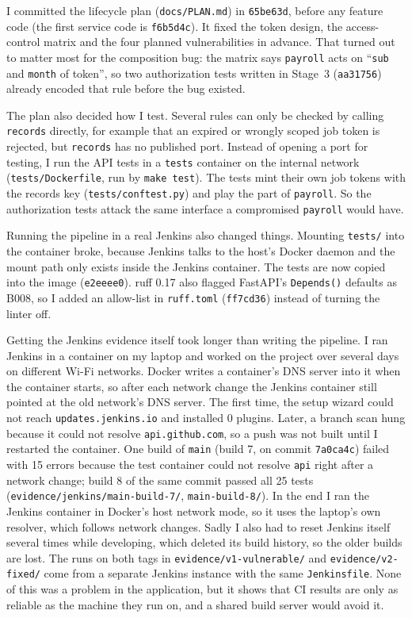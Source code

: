 \documentclass[11pt,a4paper]{article}
\newcommand{\file}[1]{\nolinkurl{#1}}
\newcommand{\commit}[1]{\texttt{#1}}
\begin{document}
I committed the lifecycle plan (\file{docs/PLAN.md}) in \commit{65be63d}, before any feature code (the first service code is \commit{f6b5d4c}). It fixed the token design, the access-control matrix and the four planned vulnerabilities in advance. That turned out to matter most for the composition bug: the matrix says \texttt{payroll} acts on ``\texttt{sub} and \texttt{month} of token'', so two authorization tests written in Stage~3 (\commit{aa31756}) already encoded that rule before the bug existed.

The plan also decided how I test. Several rules can only be checked by calling \texttt{records} directly, for example that an expired or wrongly scoped job token is rejected, but \texttt{records} has no published port. Instead of opening a port for testing, I run the API tests in a \texttt{tests} container on the internal network (\file{tests/Dockerfile}, run by \texttt{make test}). The tests mint their own job tokens with the records key (\file{tests/conftest.py}) and play the part of \texttt{payroll}. So the authorization tests attack the same interface a compromised \texttt{payroll} would have.

Running the pipeline in a real Jenkins also changed things. Mounting \file{tests/} into the container broke, because Jenkins talks to the host's Docker daemon and the mount path only exists inside the Jenkins container. The tests are now copied into the image (\commit{e2eeee0}). ruff 0.17 also flagged FastAPI's \texttt{Depends()} defaults as B008, so I added an allow-list in \file{ruff.toml} (\commit{ff7cd36}) instead of turning the linter off.

Getting the Jenkins evidence itself took longer than writing the pipeline. I ran Jenkins in a container on my laptop and worked on the project over several days on different Wi-Fi networks. Docker writes a container's DNS server into it when the container starts, so after each network change the Jenkins container still pointed at the old network's DNS server. The first time, the setup wizard could not reach \texttt{updates.jenkins.io} and installed 0 plugins. Later, a branch scan hung because it could not resolve \texttt{api.github.com}, so a push was not built until I restarted the container. One build of \texttt{main} (build 7, on commit \commit{7a0ca4c}) failed with 15 errors because the test container could not resolve \texttt{api} right after a network change; build 8 of the same commit passed all 25 tests (\file{evidence/jenkins/main-build-7/}, \file{main-build-8/}). In the end I ran the Jenkins container in Docker's host network mode, so it uses the laptop's own resolver, which follows network changes. Sadly I also had to reset Jenkins itself several times while developing, which deleted its build history, so the older builds are lost. The runs on both tags in \file{evidence/v1-vulnerable/} and \file{evidence/v2-fixed/} come from a separate Jenkins instance with the same \file{Jenkinsfile}. None of this was a problem in the application, but it shows that CI results are only as reliable as the machine they run on, and a shared build server would avoid it.
\end{document}
